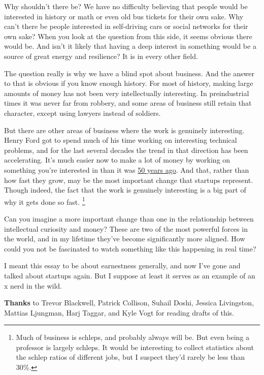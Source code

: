 Why shouldn't there be? We have no difficulty believing that people
would be interested in history or math or even old bus tickets for their
own sake. Why can't there be people interested in self-driving cars or
social networks for their own sake? When you look at the question from
this side, it seems obvious there would be. And isn't it likely that
having a deep interest in something would be a source of great energy
and resilience? It is in every other field.

The question really is why we have a blind spot about business. And the
answer to that is obvious if you know enough history. For most of
history, making large amounts of money has not been very intellectually
interesting. In preindustrial times it was never far from robbery, and
some areas of business still retain that character, except using lawyers
instead of soldiers.

But there are other areas of business where the work is genuinely
interesting. Henry Ford got to spend much of his time working on
interesting technical problems, and for the last several decades the
trend in that direction has been accelerating. It's much easier now to
make a lot of money by working on something you're interested in than it
was \href{re.html}{50 years ago}. And that, rather than how fast they
grow, may be the most important change that startups represent. Though
indeed, the fact that the work is genuinely interesting is a big part of
why it gets done so fast. \footnote{Much of business is schleps, and probably always will be. But
even being a professor is largely schleps. It would be interesting to
collect statistics about the schlep ratios of different jobs, but I
suspect they'd rarely be less than 30\%.}

Can you imagine a more important change than one in the relationship
between intellectual curiosity and money? These are two of the most
powerful forces in the world, and in my lifetime they've become
significantly more aligned. How could you not be fascinated to watch
something like this happening in real time?

I meant this essay to be about earnestness generally, and now I've gone
and talked about startups again. But I suppose at least it serves as an
example of an x nerd in the wild.


\textbf{Thanks} to Trevor Blackwell, Patrick Collison, Suhail Doshi,
Jessica Livingston, Mattias Ljungman, Harj Taggar, and Kyle Vogt for
reading drafts of this.